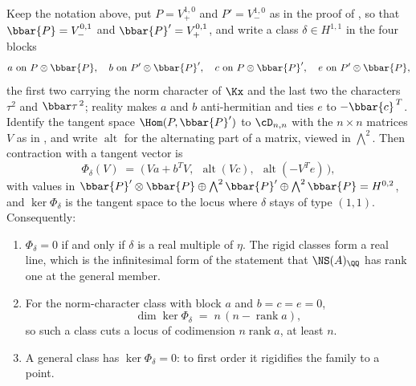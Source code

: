 \begin{proposition}%
\label{prop:rigidity}
Keep the notation above, put $P=V_{+}^{1,0}$ and $P'=V_{-}^{1,0}$ as in the
proof of , so that $\bbar{P}=V_{-}^{0,1}$ and
$\bbar{P}'=V_{+}^{0,1}$, and write a class $\delta\in H^{1,1}$ in the four
blocks
\[
  a\ \text{on}\ P\otimes\bbar{P},\quad
  b\ \text{on}\ P'\otimes\bbar{P}',\quad
  c\ \text{on}\ P\otimes\bbar{P}',\quad
  e\ \text{on}\ P'\otimes\bbar{P},
\]
the first two carrying the norm character of $\Kx$ and the last two the
characters $\tau^{2}$ and $\bbar\tau^{\,2}$; reality makes $a$ and $b$
anti-hermitian and ties $e$ to $-\bbar{c}^{\,T}$. Identify the tangent space
$\Hom(P,\bbar{P}')$ to $\cD_{n,n}$ with the $n\times n$ matrices $V$ as in
, and write $\operatorname{alt}$ for the alternating part
of a matrix, viewed in $\bigwedge^{2}$. Then contraction with a tangent
vector is
\begin{equation}\label{eq:phidelta}
  \Phi_{\delta}(V)
  \;=\;\bigl(\,Va+b^{T}V,\ \ \operatorname{alt}(Vc),\ \
       \operatorname{alt}(-V^{T}e)\,\bigr),
\end{equation}
with values in
$\bbar{P}'\otimes\bbar{P}\oplus\bigwedge^{2}\bbar{P}'\oplus\bigwedge^{2}\bbar{P}
=H^{0,2}$, and $\ker\Phi_{\delta}$ is the tangent space to the locus where
$\delta$ stays of type $(1,1)$. Consequently:
\begin{enumerate}[label=\textup{(\roman*)},nosep]
\item $\Phi_{\delta}=0$ if and only if $\delta$ is a real multiple of $\eta$.
  The rigid classes form a real line, which is the infinitesimal form of the
  statement that $\NS(A)_{\QQ}$ has rank one at the general member.
\item For the norm-character class with block $a$ and $b=c=e=0$,
  \[
    \dim\ker\Phi_{\delta}\;=\;n\,(n-\operatorname{rank}a),
  \]
  so such a class cuts a locus of codimension $n\operatorname{rank}a$, at
  least $n$.
\item A general class has $\ker\Phi_{\delta}=0$: to first order it
  rigidifies the family to a point.
\end{enumerate}
\end{proposition}

